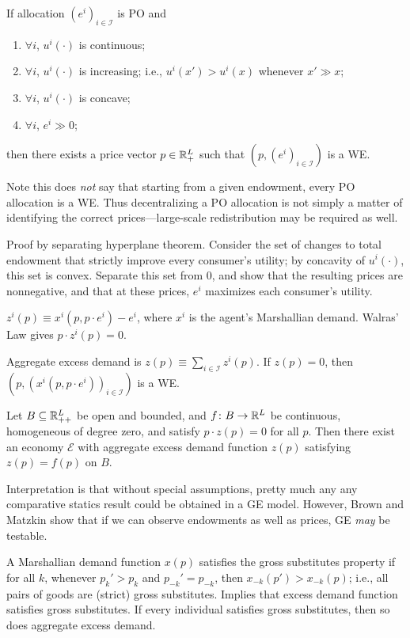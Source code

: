 \documentclass[8pt,letterpaper, landscape]{extarticle} %
\begin{document}
\begin{multicols}{3}
\begin{description}
 If allocation $ (e^i)_{i \in \mathcal{I}} $ is PO and
\begin{enumerate}
\item $ \forall i $, $ u^i (\cdot) $ is continuous;
\item $ \forall i $, $ u^i (\cdot) $ is increasing; i.e., $ u^i(x') > u^i(x) $ whenever $ x' \gg x $;
\item $ \forall i $, $ u^i (\cdot) $ is concave;
\item $ \forall i $, $ e^i \gg 0 $;
\end{enumerate}
then there exists a price vector $ p \in \mathbb{R}^L_+ $ such that $ (p, (e^i)_{i \in \mathcal{I}}) $ is  a WE.

Note this does \textit{not} say that starting from a given endowment, every PO allocation is a WE. Thus decentralizing a PO allocation is not simply a matter of identifying the correct prices---large-scale redistribution may be required as well.

Proof by separating hyperplane theorem. Consider the set of changes to total endowment that strictly improve every consumer's utility; by concavity of $ u^i (\cdot) $, this set is convex. Separate this set from $ 0 $, and show that the resulting prices are nonnegative, and that at these prices, $ e^i $ maximizes each consumer's utility.

 $ z^i (p) \equiv x^i (p, p \cdot e^i) - e^i $, where $ x^i $ is the agent's Marshallian demand. Walras' Law gives $ p \cdot z^i (p) = 0 $.

Aggregate excess demand is $ z(p) \equiv \sum_{i \in \mathcal{I}} z^i(p) $. If $ z(p) = 0 $, then $ (p, (x^i(p, p \cdot e^i))_{i \in \mathcal{I}}) $ is a WE.

 Let $ B \subseteq \mathbb{R}^L_{++} $ be open and bounded, and $ f \colon B \to \mathbb{R}^L $ be continuous, homogeneous of degree zero, and satisfy $ p \cdot z(p) = 0 $ for all $ p $. Then there exist an economy $ \mathcal{E} $ with aggregate excess demand function $ z(p) $ satisfying $ z(p) = f(p) $ on $ B $.

Interpretation is that without special assumptions, pretty much any any comparative statics result could be obtained in a GE model. However, Brown and Matzkin show that if we can observe endowments as well as prices, GE \textit{may} be testable.

 A Marshallian demand function $ x(p) $ satisfies the gross substitutes property if for all $ k $, whenever $ p_k' > p_k $ and $ p_{-k}' = p_{-k} $, then $ x_{-k}(p') > x_{-k}(p) $; i.e., all pairs of goods are (strict) gross substitutes. Implies that excess demand function satisfies gross substitutes. If every individual satisfies gross substitutes, then so does aggregate excess demand.


\end{description}
\end{multicols}
\end{document}
